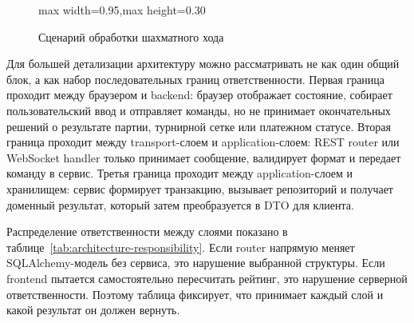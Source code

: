 \begin{figure}[H]
\centering
\begin{adjustbox}{max width=0.95\textwidth,max height=0.30\textheight}
\end{adjustbox}
\caption{Сценарий обработки шахматного хода}\label{fig:move-flow}
\end{figure}



Для большей детализации архитектуру можно рассматривать не как один общий блок, а как набор последовательных границ ответственности. Первая граница проходит между браузером и backend: браузер отображает состояние, собирает пользовательский ввод и отправляет команды, но не принимает окончательных решений о результате партии, турнирной сетке или платежном статусе. Вторая граница проходит между transport-слоем и application-слоем: REST router или WebSocket handler только принимает сообщение, валидирует формат и передает команду в сервис. Третья граница проходит между application-слоем и хранилищем: сервис формирует транзакцию, вызывает репозиторий и получает доменный результат, который затем преобразуется в DTO для клиента.

Распределение ответственности между слоями показано в таблице~\ref{tab:architecture-responsibility}. Если router напрямую меняет SQLAlchemy-модель без сервиса, это нарушение выбранной структуры. Если frontend пытается самостоятельно пересчитать рейтинг, это нарушение серверной ответственности. Поэтому таблица фиксирует, что принимает каждый слой и какой результат он должен вернуть.

